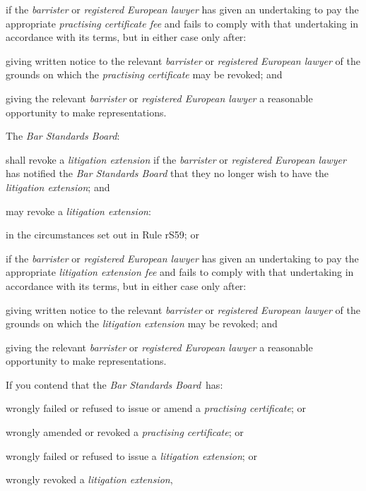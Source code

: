\item if the \emph{barrister} or \emph{registered European lawyer} has
given an undertaking to pay the appropriate \emph{practising certificate
fee} and fails to comply with that undertaking in accordance with its
terms, but in either case only after:

\rl \item giving written notice to the relevant \emph{barrister} or
\emph{registered European lawyer} of the grounds on which the
\emph{practising certificate} may be revoked; and

\item giving the relevant \emph{barrister} or \emph{registered European
lawyer} a reasonable opportunity to make representations.\lr\la
\ln
{}

The \emph{Bar Standards Board}:\nl\item shall revoke a \emph{litigation extension} if the \emph{barrister} or
\emph{registered European lawyer} has notified the \emph{Bar Standards
Board} that they no longer wish to have the \emph{litigation extension};
and
\item may revoke a \emph{litigation extension}:

\al\item in the circumstances set out in Rule rS59; or

\item if the \emph{barrister} or \emph{registered European lawyer} has
given an undertaking to pay the appropriate \emph{litigation extension
fee} and fails to comply with that undertaking in accordance with its
terms, but in either case only after:

\rl\item giving written notice to the relevant \emph{barrister} or
\emph{registered European lawyer} of the grounds on which the
\emph{litigation extension} may be revoked; and

\item giving the relevant \emph{barrister} or \emph{registered European
lawyer} a reasonable opportunity to make representations.
\lr\la\ln
{}



If you contend that the \emph{Bar Standards Board}~has:\nl\item wrongly failed or refused to issue or amend a \emph{practising
certificate}; or
\item wrongly amended or revoked a \emph{practising certificate}; or
\item wrongly failed or refused to issue a \emph{litigation extension}; or
\item wrongly revoked a \emph{litigation extension},

